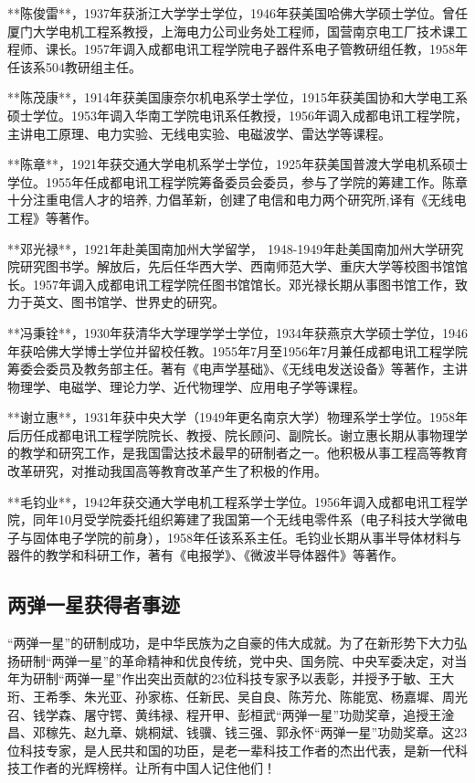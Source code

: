 \documentclass[UTF8]{ctexart}
\begin{document}
**陈俊雷**，1937年获浙江大学学士学位，1946年获美国哈佛大学硕士学位。曾任厦门大学电机工程系教授，上海电力公司业务处工程师，国营南京电工厂技术课工程师、课长。1957年调入成都电讯工程学院电子器件系电子管教研组任教，1958年任该系504教研组主任。

**陈茂康**，1914年获美国康奈尔机电系学士学位，1915年获美国协和大学电工系硕士学位。1953年调入华南工学院电讯系任教授，1956年调入成都电讯工程学院，主讲电工原理、电力实验、无线电实验、电磁波学、雷达学等课程。

**陈章**，1921年获交通大学电机系学士学位，1925年获美国普渡大学电机系硕士学位。1955年任成都电讯工程学院筹备委员会委员，参与了学院的筹建工作。陈章十分注重电信人才的培养, 力倡革新，创建了电信和电力两个研究所,译有《无线电工程》等著作。

**邓光禄**，1921年赴美国南加州大学留学， 1948-1949年赴美国南加州大学研究院研究图书学。解放后，先后任华西大学、西南师范大学、重庆大学等校图书馆馆长。1957年调入成都电讯工程学院任图书馆馆长。邓光禄长期从事图书馆工作，致力于英文、图书馆学、世界史的研究。

**冯秉铨**，1930年获清华大学理学学士学位，1934年获燕京大学硕士学位，1946年获哈佛大学博士学位并留校任教。1955年7月至1956年7月兼任成都电讯工程学院筹委会委员及教务部主任。著有《电声学基础》、《无线电发送设备》等著作，主讲物理学、电磁学、理论力学、近代物理学、应用电子学等课程。

**谢立惠**，1931年获中央大学（1949年更名南京大学）物理系学士学位。1958年后历任成都电讯工程学院院长、教授、院长顾问、副院长。谢立惠长期从事物理学的教学和研究工作，是我国雷达技术最早的研制者之一。他积极从事工程高等教育改革研究，对推动我国高等教育改革产生了积极的作用。

**毛钧业**，1942年获交通大学电机工程系学士学位。1956年调入成都电讯工程学院，同年10月受学院委托组织筹建了我国第一个无线电零件系（电子科技大学微电子与固体电子学院的前身），1958年任该系系主任。毛钧业长期从事半导体材料与器件的教学和科研工作，著有《电报学》、《微波半导体器件》等著作。


    \subsection{两弹一星获得者事迹}
    “两弹一星”的研制成功，是中华民族为之自豪的伟大成就。为了在新形势下大力弘扬研制“两弹一星”的革命精神和优良传统，党中央、国务院、中央军委决定，对当年为研制“两弹一星”作出突出贡献的23位科技专家予以表彰，并授予于敏、王大珩、王希季、朱光亚、孙家栋、任新民、吴自良、陈芳允、陈能宽、杨嘉墀、周光召、钱学森、屠守锷、黄纬禄、程开甲、彭桓武“两弹一星”功勋奖章，追授王淦昌、邓稼先、赵九章、姚桐斌、钱骥、钱三强、郭永怀“两弹一星”功勋奖章。这23位科技专家，是人民共和国的功臣，是老一辈科技工作者的杰出代表，是新一代科技工作者的光辉榜样。让所有中国人记住他们！
\end{document}
